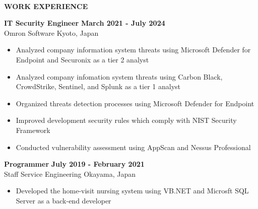 \begin{flushleft}
    \hrulefill \\
    \begin{large}
        \begin{center}\textbf{WORK EXPERIENCE}\end{center}
    \end{large} 
\end{flushleft}
\textbf{IT Security Engineer} \hfill \textbf{March 2021 - July 2024} \\
Omron Software \hfill Kyoto, Japan
\begin{itemize}
    \item Analyzed company information system threats using Microsoft Defender for Endpoint and Securonix as a tier 2 analyst
    \item Analyzed company infomation system threats using Carbon Black, CrowdStrike, Sentinel, and Splunk as a tier 1 analyst
    \item Organized threats detection processes using Microsoft Defender for Endpoint
    \item Improved development security rules which comply with NIST Security Framework
    \item Conducted vulnerability assessment using AppScan and Nessus Professional
\end{itemize}
\textbf{Programmer} \hfill \textbf{July 2019 - February 2021} \\
Staff Service Engineering \hfill Okayama, Japan
\begin{itemize}
    \item Developed the home-visit nursing system using VB.NET and Microsft SQL Server as a back-end developer
\end{itemize}